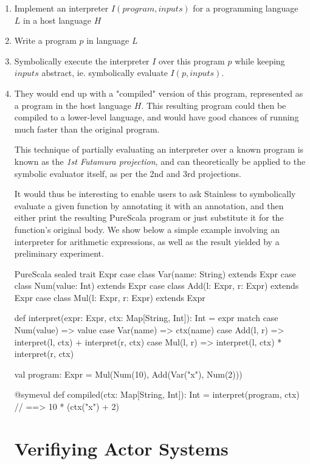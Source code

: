 \documentclass[a4paper,twoside]{article}
\begin{document}
\begin{enumerate}
\item Implement an interpreter $I(program, inputs)$ for a programming language $L$ in a host language $H$
\item Write a program $p$ in language $L$
\item Symbolically execute the interpreter $I$ over this program $p$ while keeping  $inputs$ abstract, ie. symbolically evaluate $I(p, inputs)$.
\item They would end up with a "compiled" version of this program, represented as a program in the host language $H$. This resulting program could then be compiled to a lower-level language, and would have good chances of running much faster than the original program.

This technique of partially evaluating an interpreter over a known program is known as the \textit{1st Futamura projection}, and can theoretically be applied to the symbolic evaluator itself, as per the 2nd and 3rd projections. \cite{futamura}

It would thus be interesting to enable users to ask Stainless to symbolically evaluate a given function by annotating it with an annotation, and then either print the resulting PureScala program or just substitute it for the function's original body. We show below a simple example involving an interpreter for arithmetic expressions, as well as the result yielded by a preliminary experiment.

\begin{ShortCode}{PureScala}
sealed trait Expr
case class Var(name: String)     extends Expr
case class Num(value: Int)       extends Expr
case class Add(l: Expr, r: Expr) extends Expr
case class Mul(l: Expr, r: Expr) extends Expr

def interpret(expr: Expr, ctx: Map[String, Int]): Int = expr match {
  case Num(value) => value
  case Var(name)  => ctx(name)
  case Add(l, r)  => interpret(l, ctx) + interpret(r, ctx)
  case Mul(l, r)  => interpret(l, ctx) * interpret(r, ctx)
}

val program: Expr = Mul(Num(10), Add(Var("x"), Num(2)))

@symeval
def compiled(ctx: Map[String, Int]): Int = {
  interpret(program, ctx) // ==> 10 * (ctx("x") + 2)
}
\end{ShortCode}


\clearpage
\section{Verifiying Actor Systems}
\label{actors}


\end{enumerate}
\end{document}
